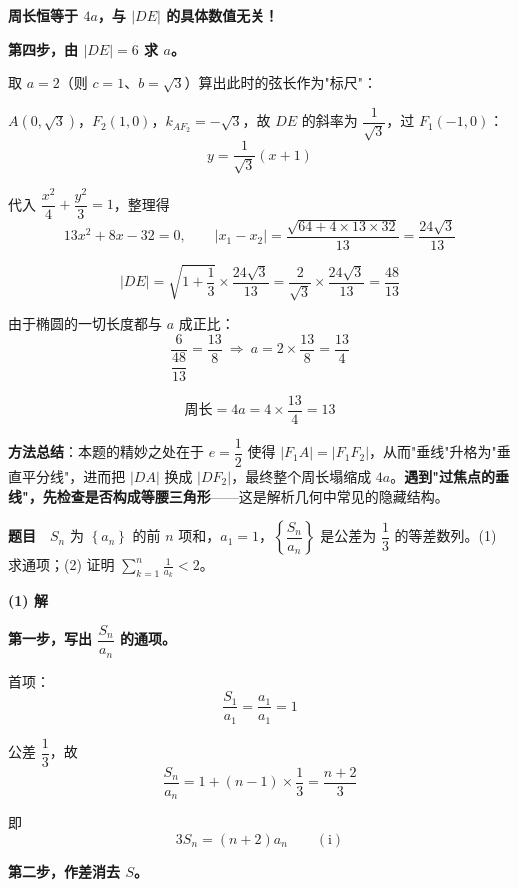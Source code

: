 \textbf{周长恒等于 $4a$，与 $|DE|$ 的具体数值无关！}

\textbf{第四步，由 $|DE|=6$ 求 $a$。}

取 $a=2$（则 $c=1$、$b=\sqrt3$）算出此时的弦长作为"标尺"：

$A\left(0,\sqrt3\right)$，$F_2(1,0)$，$k_{AF_2}=-\sqrt3$，故 $DE$ 的斜率为 $\dfrac1{\sqrt3}$，过 $F_1(-1,0)$：
\[y=\frac1{\sqrt3}(x+1)\]

代入 $\dfrac{x^{2}}4+\dfrac{y^{2}}3=1$，整理得
\[13x^{2}+8x-32=0,\qquad \left|x_1-x_2\right|=\frac{\sqrt{64+4\times13\times32}}{13}=\frac{24\sqrt3}{13}\]

\[|DE|=\sqrt{1+\frac13}\times\frac{24\sqrt3}{13}=\frac2{\sqrt3}\times\frac{24\sqrt3}{13}=\frac{48}{13}\]

由于椭圆的一切长度都与 $a$ 成正比：
\[\frac6{\dfrac{48}{13}}=\frac{13}8\ \Longrightarrow\ a=2\times\frac{13}8=\frac{13}4\]

\[\text{周长}=4a=4\times\frac{13}4=13\]


\begin{gktip}
\textbf{方法总结}：本题的精妙之处在于 $e=\dfrac12$ 使得 $\left|F_1A\right|=\left|F_1F_2\right|$，从而"垂线"升格为"垂直平分线"，进而把 $|DA|$ 换成 $\left|DF_2\right|$，最终整个周长塌缩成 $4a$。\textbf{遇到"过焦点的垂线"，先检查是否构成等腰三角形}——这是解析几何中常见的隐藏结构。
\end{gktip}

\par\medskip



\textbf{题目}　$S_n$ 为 $\left\{a_n\right\}$ 的前 $n$ 项和，$a_1=1$，$\left\{\dfrac{S_n}{a_n}\right\}$ 是公差为 $\dfrac13$ 的等差数列。(1) 求通项；(2) 证明 $\displaystyle\sum_{k=1}^n\frac1{a_k}<2$。

\par\medskip

\textbf{(1) 解}

\textbf{第一步，写出 $\dfrac{S_n}{a_n}$ 的通项。}

首项：
\[\frac{S_1}{a_1}=\frac{a_1}{a_1}=1\]

公差 $\dfrac13$，故
\[\frac{S_n}{a_n}=1+(n-1)\times\frac13=\frac{n+2}3\]

即
\[3S_n=(n+2)a_n\qquad(\text{i})\]

\textbf{第二步，作差消去 $S$。}

